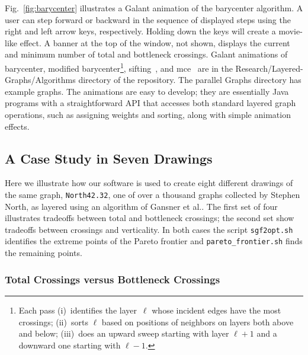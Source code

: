 Fig.~\ref{fig:barycenter} illustrates a Galant animation of the barycenter algorithm. A user can step forward or backward in the sequence of displayed steps using the right and left arrow keys, respectively. Holding down the keys will create a movie-like effect. A banner at the top of the window, not shown, displays the current and minimum number of total and bottleneck crossings. Galant animations of barycenter, modified barycenter\footnote{Each pass (i)~identifies the layer~$\ell$ whose incident edges have the most crossings; (ii)~sorts $\ell$ based on positions of neighbors on layers both above and below; (iii)~does an upward sweep starting with layer $\ell+1$ and a downward one starting with $\ell-1$.}, sifting~\cite{1999-GD-Matuszewski-p217}, and mce~\cite{2012-JEA-Stallmann} are in the Research/Layered-Graphs/Algorithms directory of the repository. The parallel Graphs directory has example graphs.
The animations are easy to develop; they are essentially Java programs with a straightforward API that accesses both standard layered graph operations, such as assigning weights and sorting, along with simple animation effects.

\subsection{A Case Study in Seven Drawings} \label{sec:case_study}

Here we illustrate how our software is used to create eight different drawings of the same graph, \texttt{North42.32}, one of over a thousand graphs collected by Stephen North, as layered using an algorithm of Gansner et al.\cite{1993-IEEE_SE-Gasner}. The first set of four illustrates tradeoffs between total and bottleneck crossings; the second set show tradeoffs between crossings and verticality.
In both cases the script \texttt{sgf2opt.sh} identifies the extreme points of the Pareto frontier and \texttt{pareto\_frontier.sh} finds the remaining points.

\subsubsection{Total Crossings versus Bottleneck Crossings}

